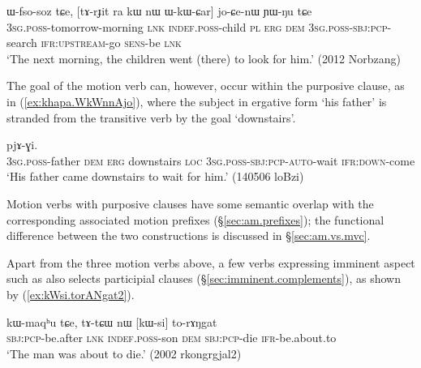 \begin{exe}
	\ex \label{ex:WkWCar.loCenW}
	\gll ɯ-fso-soz tɕe, [tɤ-rɟit ra kɯ nɯ ɯ-kɯ-ɕar] jo-ɕe-nɯ ɲɯ-ŋu tɕe \\
	\textsc{3sg}.\textsc{poss}-tomorrow-morning \textsc{lnk} \textsc{indef}.\textsc{poss}-child \textsc{pl} \textsc{erg} \textsc{dem} \textsc{3sg}.\textsc{poss}-\textsc{sbj}:\textsc{pcp}-search \textsc{ifr}:\textsc{upstream}-go \textsc{sens}-be \textsc{lnk} \\
	\glt  `The next morning, the children went (there) to look for him.'  (2012 Norbzang)
\end{exe}

The goal of the motion verb can, however, occur within the purposive clause, as in (\ref{ex:khapa.WkWnnAjo}), where the subject in ergative form  `his father' is stranded from the transitive verb  by the goal  `downstairs'.

\begin{exe}
	\ex \label{ex:khapa.WkWnnAjo}
	 pjɤ-ɣi.  \\
	\textsc{3sg}.\textsc{poss}-father \textsc{dem} \textsc{erg} downstairs \textsc{loc}    \textsc{3sg}.\textsc{poss}-\textsc{sbj}:\textsc{pcp}-\textsc{auto}-wait \textsc{ifr}:\textsc{down}-come \\
	\glt `His father came downstairs to wait for him.' (140506 loBzi)
\end{exe}


Motion verbs with purposive clauses have some semantic overlap with the corresponding associated motion prefixes (§\ref{sec:am.prefixes}); the functional difference between the two constructions is discussed in §\ref{sec:am.vs.mvc}.

Apart from the three motion verbs above, a few verbs expressing imminent aspect such as  also selects participial clauses (§\ref{sec:imminent.complements}), as shown by (\ref{ex:kWsi.torANgat2}).

\begin{exe}
	\ex \label{ex:kWsi.torANgat2}
	\gll kɯ-maqʰu tɕe, tɤ-tɕɯ nɯ [kɯ-si] to-rɤŋgat \\
	\textsc{sbj}:\textsc{pcp}-be.after \textsc{lnk} \textsc{indef}.\textsc{poss}-son \textsc{dem} \textsc{sbj}:\textsc{pcp}-die \textsc{ifr}-be.about.to \\
	\glt `The man was about to die.' (2002 rkongrgjal2)
\end{exe} 

